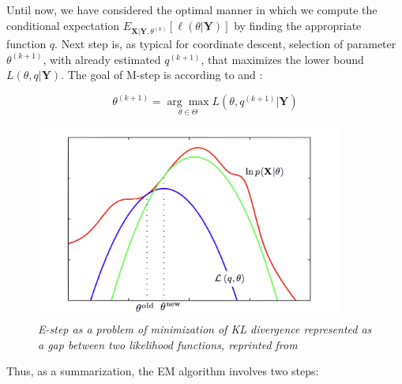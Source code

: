 Until now, we have considered the optimal manner in which we compute the conditional expectation $E_{\textbf{X}|\textbf{Y},\theta^{(k)}} [\ell(\theta|\textbf{Y})]$ by 
finding the appropriate function $q$. Next step is, as typical for coordinate descent, selection of parameter $\theta^{(k+1)}$, 
with already estimated $q^{(k+1)}$, that maximizes the lower bound $L(\theta,q|\textbf{Y})$. The goal of M-step is according to \citep{Dempster1977} and \citep{Gu2008}:

\begin{equation}
    \theta^{(k+1)} = \underset{\theta \in \Theta}{\arg\max} L(\theta, q^{(k+1)}|\textbf{Y})
\end{equation}

\begin{figure}[ht]

\begin{center}
	\includegraphics[width=0.9\textwidth]{Figs/Loglike.png}
\end{center}

\caption[Construction of log-likelihood lower bound]{\textit{E-step as a problem of minimization of KL divergence represented as a gap between two likelihood functions, reprinted from \citep{Bishop2006}}}
\label{fig:Loglike}
\end{figure}

\noindent Thus, as a summarization, the EM algorithm involves two steps:

